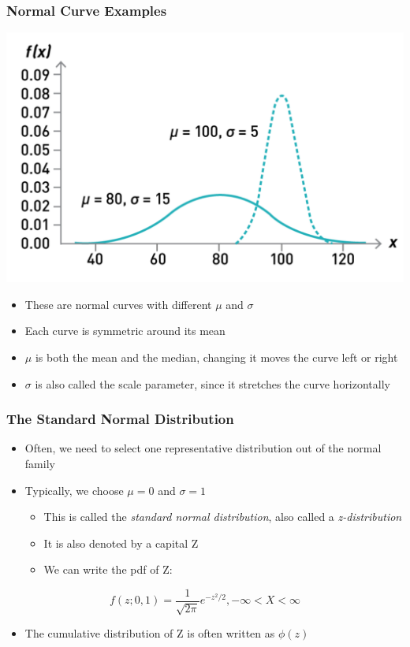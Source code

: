 \documentclass[12pt, block=fill]{beamer}
\begin{document}
\begin{frame}
  \frametitle{Normal Curve Examples}
  \begin{center}
      \includegraphics[width=.5\linewidth]{figures/normal_curve.png}
  \end{center}
  \begin{itemize}
      \item These are normal curves with different $\mu$ and $\sigma$
      \item Each curve is symmetric around its mean
      \item $\mu$ is both the mean and the median, changing it moves the curve left or right
      \item $\sigma$ is also called the scale parameter, since it stretches the curve horizontally
  \end{itemize}
\end{frame}

\begin{frame}
  \frametitle{The Standard Normal Distribution}
  \begin{itemize}
      \item Often, we need to select one representative distribution out of the normal family
      \item Typically, we choose $\mu=0$ and $\sigma=1$
      \begin{itemize}
          \item This is called the \textit{standard normal distribution}, also called a \textit{z-distribution}
          \item It is also denoted by a capital Z
          \item We can write the pdf of Z:
      \end{itemize}
  \end{itemize}
  \begin{equation}
      f(z; 0, 1)= \frac{1}{\sqrt{2\pi}}e^{-z^{2}/2},
      -\infty < X < \infty
  \end{equation}  
  \begin{itemize}
      \item The cumulative distribution of Z is often written as $\phi(z)$
  \end{itemize}
\end{frame}
\end{document}
